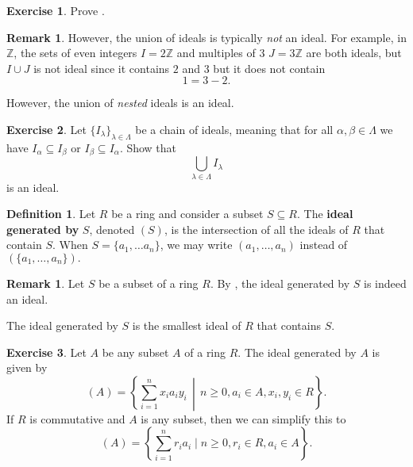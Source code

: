 \documentclass[12pt]{report}
\numberwithin{equation}{section}
\numberwithin{theorem}{chapter}
\theoremstyle{definition}
\newtheorem{definition}[theorem]{Definition}
\newtheorem{exercise}{Exercise}
\newtheorem*{basic properties}{Basic Properties}
\newtheorem*{Important Remark}{Important Remark}
\newtheorem{remark}[theorem]{Remark}
\newcommand{\df}[1]{{\bf #1}\index{#1}}
\begin{document}
\begin{exercise}
	Prove .
\end{exercise}



\begin{remark}
	However, the union of ideals is typically \emph{not} an ideal. For example, in $\mathbb{Z}$, the sets of even integers $I = 2\mathbb{Z}$ and multiples of $3$ $J = 3 \mathbb{Z}$ are both ideals, but $I \cup J$ is not ideal since it contains $2$ and $3$ but it does not contain
	$$1 = 3 - 2.$$
\end{remark}

However, the union of \emph{nested} ideals is an ideal.

\begin{exercise}\label{union of nested ideals is an ideal}
	Let $\{ I_\lambda \}_{\lambda \in \Lambda}$ be a chain of ideals, meaning that for all $\alpha, \beta \in \Lambda$ we have $I_{\alpha} \subseteq I_{\beta}$ or $I_{\beta} \subseteq I_{\alpha}$. Show that
	$$\bigcup_{\lambda \in \Lambda} I_{\lambda}$$
is an ideal.
\end{exercise}

\begin{definition}
Let $R$ be a ring and consider a subset $S \subseteq R$. The \df{ideal generated by} $S$, denoted $(S)$, is the intersection of all the ideals of $R$ that contain $S$. When $S = \{ a_1, \ldots a_n \}$, we may write $(a_1, \ldots, a_n)$ instead of $(\{a_1, \ldots, a_n\}).$
\end{definition}


\begin{remark}
	Let $S$ be a subset of a ring $R$. By , the ideal generated by $S$ is indeed an ideal.
\end{remark}


The ideal generated by $S$ is the smallest ideal of $R$ that contains $S$.


\begin{exercise}\label{ideal generated by}
Let $A$ be any subset $A$ of a ring $R$. The ideal generated by $A$ is given by
$$(A)=\left\lbrace \sum_{i=1}^n x_i a_i y_i \,\middle\vert\, n \geqslant 0, a_i \in A, x_i, y_i \in R \right\rbrace.$$
If $R$ is commutative and $A$ is any subset, then we can simplify this to
$$(A)=\left\{\sum_{i=1}^n r_i a_i \mid n \geqslant 0, r_i \in R, a_i \in A\right\}.$$ 
\end{exercise}
\end{document}
